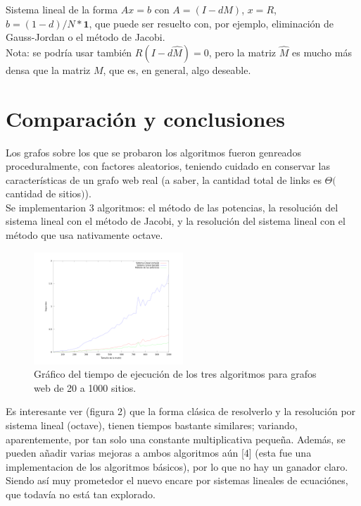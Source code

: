 \documentclass[%
    final,
    notitlepage,
    narroweqnarray,
    inline,
    twoside,
    invited
    ]{lib/ieee}
\begin{document}
Sistema lineal de la forma $Ax = b$ con $A = (I - dM)$, $x = R$, $b = (1-d)/N* \mathbf 1$, que puede ser resuelto con, por ejemplo,
 eliminación de Gauss-Jordan o el método de Jacobi.\\

Nota: se podría usar también $R(I-d\widehat{M}) = 0$, pero la matriz $\widehat{M}$ es mucho más densa que la matriz $M$, que es, en
 general, algo deseable.

\section{Comparación y conclusiones}

Los grafos sobre los que se probaron los algoritmos fueron genreados proceduralmente, con factores aleatorios,
teniendo cuidado en conservar las características de un grafo web real (a saber, la cantidad total de links es
$\Theta($cantidad de sitios$)$).\\

Se implementarion 3 algoritmos: el método de las potencias, la resolución del sistema lineal con el método de Jacobi, y la resolución
 del sistema lineal con el método que usa nativamente octave.

\begin{figure}[h!]
    \centering
    \includegraphics[width=0.5\textwidth]{img/octave_jacobi_pm.png} %
    \caption {Gráfico del tiempo de ejecución de los tres algoritmos para grafos web de 20 a 1000 sitios.}
\end{figure}

Es interesante ver (figura 2) que la forma clásica de resolverlo y la resolución por sistema lineal (octave), tienen tiempos bastante similares;
 variando, aparentemente, por tan solo una constante multiplicativa pequeña.
Además, se pueden añadir varias mejoras a ambos algoritmos aún [4] (esta fue una implementacion de los algoritmos básicos), por lo que
 no hay un ganador claro.
Siendo así muy prometedor el nuevo encare por sistemas lineales de ecuaciónes, que todavía no está tan explorado.
\end{document}
